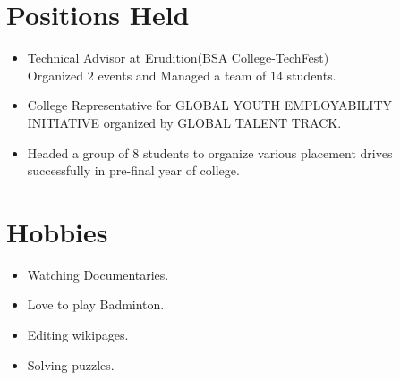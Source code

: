 \documentclass[]{deedy-resume-openfont}
\begin{document}
\begin{minipage}[t]{0.66\textwidth}
\section{Positions Held}
\begin{itemize}
\setlength\itemsep{0.001em}
    \item Technical Advisor at Erudition(BSA College-TechFest)\\
    Organized $2$ events and  Managed a team of $14$ students.
    \item College Representative for GLOBAL YOUTH EMPLOYABILITY INITIATIVE organized by GLOBAL TALENT TRACK.
    \item Headed a group of $8$ students to organize various placement drives successfully in pre-final year of college.
 \end{itemize}
\sectionsep
\section{Hobbies}
\begin{itemize}
\setlength\itemsep{0.001em}
\item Watching Documentaries.
\item Love to play Badminton.
\item Editing wikipages.
\item Solving puzzles.
\end{itemize}
\sectionsep
\end{minipage} 
\end{document}
